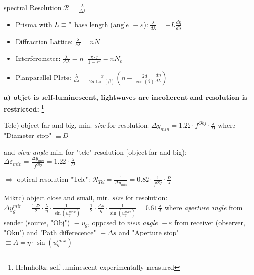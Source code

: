 spectral Resolution $\mathscr{R} = \frac{\lambda}{\Delta \lambda}$
\begin{itemize}%
	\item Prisma with $L \equiv"$ base length (angle $\equiv \varepsilon$):
	$ \frac{\lambda}{d \lambda} = -L \frac{d\eta}{d\lambda} $
	\item Diffraction Lattice: $ \frac{\lambda}{\delta\lambda} = nN $
	\item  Interferometer: $ \frac{\lambda}{\Delta\lambda} = n \cdot \frac{\pi \cdot r}{1 - r^2} = nN_e $
	\item Planparallel Plate: $ \frac{\lambda}{d\lambda} = \frac{x}{2d\tan(\beta)} \left(n - \frac{2d}{\cos(\beta)}\frac{d\eta}{d\lambda} \right) $
\end{itemize}
\vspace{2ex}

\noindent\textbf{a) objct is self-luminescent, lightwaves are incoherent and resolution is restricted:} \footnote{Helmholtz: self-luminescent experimentally measured}
\vspace{2ex} \newline

Tele) object far and big, min. \textit{size} for resolution:
\vspace{2ex} \newline
$
\Delta y_{min} = 
1.22 \cdot f^{Obj} \cdot \frac{\lambda}{D}
$
\vspace{5ex}
\qquad 
where "Diameter stop"  $\equiv D$

and \textit{view angle} min. for "tele" resolution (object far and big):
\vspace{2ex} \newline
$
\Delta \varepsilon_{min} = 
\frac{\Delta y_{min}}{f^{Obj}} = 
1.22 \cdot \frac{\lambda}{D}
$
\vspace{5ex}

$\Longrightarrow$ optical resolution "Tele":
\vspace{2ex} \newline
$
\mathscr{R}_{Tel} = \frac{1}{\Delta y_{min}} = 
0.82 \cdot \frac{1}{f^{Obj}} \cdot \frac{D}{\lambda}
$
\vspace{5ex}

Mikro) object close and small, min. \textit{size} for resolution:
\vspace{2ex} \newline
$
\Delta y_g^{min} = 
\frac{1.22}{2} \cdot \frac{\lambda}{\eta} \cdot \frac{1}{\sin(u_g^{max})} = 
\frac{1}{2} \cdot \frac{\Delta s}{\eta} \cdot \frac{1}{\sin(u_g^{max})} = 
0.61 \frac{\lambda}{A}
$
\vspace{2ex} \newline
where \textit{aperture angle} from sender (source, "Obj") $\equiv u_g$, opposed to \textit{view angle} $\equiv \varepsilon$ from receiver (observer, "Oku")
\newline
and "Path differecence" $\equiv \Delta s$
\newline
and "Aperture stop"  
$\equiv A = \eta \cdot \sin(u_g^{max}) $
\vspace{5ex}

